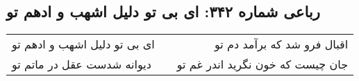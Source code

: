 \begin{center}
\section*{رباعی شماره ۳۴۲: ای بی تو دلیل اشهب و ادهم تو}
\label{sec:sh342}
\begin{longtable}{l p{0.5cm} r}
ای بی تو دلیل اشهب و ادهم تو
&&
اقبال فرو شد که برآمد دم تو
\\
دیوانه شدست عقل در ماتم تو
&&
جان چیست که خون نگرید اندر غم تو
\\
\end{longtable}
\end{center}
